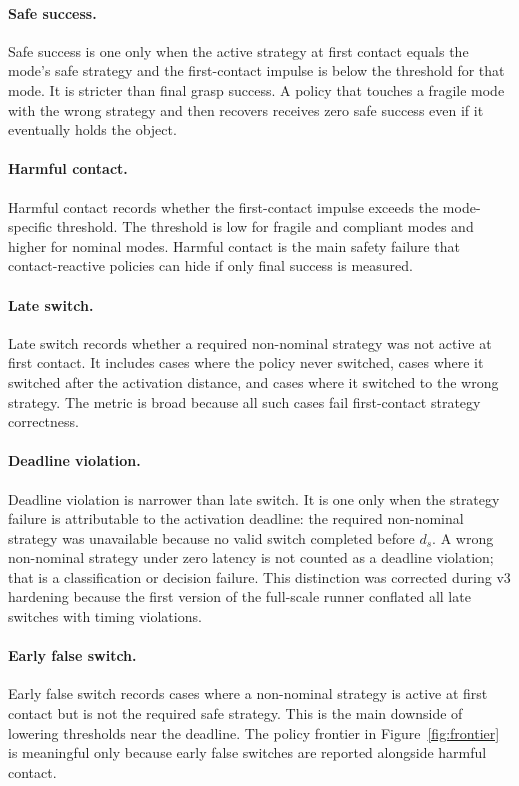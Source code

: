 \documentclass{article}
\begin{document}
\paragraph{Safe success.}
Safe success is one only when the active strategy at first contact equals the mode's safe strategy and the first-contact impulse is below the threshold for that mode. It is stricter than final grasp success. A policy that touches a fragile mode with the wrong strategy and then recovers receives zero safe success even if it eventually holds the object.

\paragraph{Harmful contact.}
Harmful contact records whether the first-contact impulse exceeds the mode-specific threshold. The threshold is low for fragile and compliant modes and higher for nominal modes. Harmful contact is the main safety failure that contact-reactive policies can hide if only final success is measured.

\paragraph{Late switch.}
Late switch records whether a required non-nominal strategy was not active at first contact. It includes cases where the policy never switched, cases where it switched after the activation distance, and cases where it switched to the wrong strategy. The metric is broad because all such cases fail first-contact strategy correctness.

\paragraph{Deadline violation.}
Deadline violation is narrower than late switch. It is one only when the strategy failure is attributable to the activation deadline: the required non-nominal strategy was unavailable because no valid switch completed before $d_s$. A wrong non-nominal strategy under zero latency is not counted as a deadline violation; that is a classification or decision failure. This distinction was corrected during v3 hardening because the first version of the full-scale runner conflated all late switches with timing violations.

\paragraph{Early false switch.}
Early false switch records cases where a non-nominal strategy is active at first contact but is not the required safe strategy. This is the main downside of lowering thresholds near the deadline. The policy frontier in Figure~\ref{fig:frontier} is meaningful only because early false switches are reported alongside harmful contact.
\end{document}
